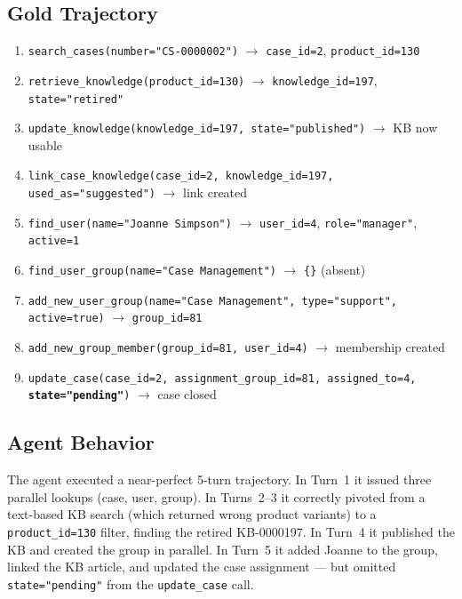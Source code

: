 \subsection{Gold Trajectory}
\label{gold-trajectory}

\begin{enumerate}
  \item \texttt{search\_cases(number="CS-0000002")}
        $\to$ \texttt{case\_id=2}, \texttt{product\_id=130}
  \item \texttt{retrieve\_knowledge(product\_id=130)}
        $\to$ \texttt{knowledge\_id=197}, \texttt{state="retired"}
  \item \texttt{update\_knowledge(knowledge\_id=197, state="published")}
        $\to$ KB now usable
  \item \texttt{link\_case\_knowledge(case\_id=2, knowledge\_id=197,
        used\_as="suggested")}
        $\to$ link created
  \item \texttt{find\_user(name="Joanne Simpson")}
        $\to$ \texttt{user\_id=4}, \texttt{role="manager"},
        \texttt{active=1}
  \item \texttt{find\_user\_group(name="Case Management")}
        $\to$ \texttt{\{\}} (absent)
  \item \texttt{add\_new\_user\_group(name="Case Management",
        type="support", active=true)}
        $\to$ \texttt{group\_id=81}
  \item \texttt{add\_new\_group\_member(group\_id=81, user\_id=4)}
        $\to$ membership created
  \item \texttt{update\_case(case\_id=2, assignment\_group\_id=81,
        assigned\_to=4,}
        \textbf{\texttt{state="pending"}}\texttt{)}
        $\to$ case closed
\end{enumerate}

\subsection{Agent Behavior}
\label{agent-behavior}

The agent executed a near-perfect 5-turn trajectory. In Turn~1 it issued
three parallel lookups (case, user, group). In Turns~2--3 it correctly
pivoted from a text-based KB search (which returned wrong product
variants) to a \texttt{product\_id=130} filter, finding the retired
KB-0000197. In Turn~4 it published the KB and created the group in
parallel. In Turn~5 it added Joanne to the group, linked the KB article,
and updated the case assignment --- but omitted \texttt{state="pending"}
from the \texttt{update\_case} call.

